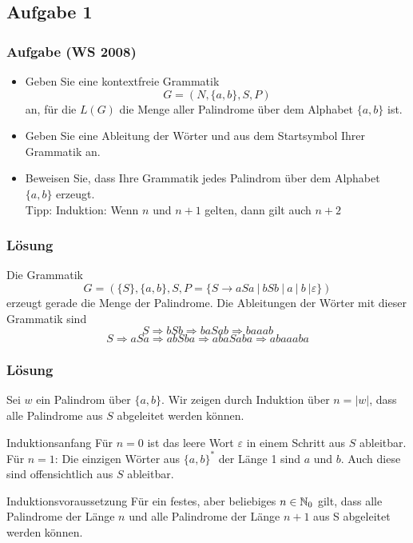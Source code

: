 \subsection{Aufgabe 1}
\begin{frame}
	\frametitle{Aufgabe (WS 2008) }
	\begin{itemize}
		\item Geben Sie eine kontextfreie Grammatik $$G = (N, \{a, b\}, S, P )$$ an, für die $L(G)$ die Menge aller Palindrome über dem Alphabet $\{a, b\}$ ist.
		\item Geben Sie eine Ableitung der Wörter  und  aus dem Startsymbol Ihrer Grammatik an.
		\item Beweisen Sie, dass Ihre Grammatik jedes Palindrom über dem Alphabet $\{a, b\}$ erzeugt.\\
		Tipp: Induktion: Wenn $n$ und $n+1$ gelten, dann gilt auch $n+2$
	\end{itemize}
\end{frame}

\begin{frame}
	\frametitle{Lösung}
	Die Grammatik $$G = (\{S\}, \{a, b\}, S, P = \{S \to aSa \ | \ bSb \ | \ a \ | \ b \ | \varepsilon \})$$ erzeugt gerade die Menge der Palindrome. \pause Die Ableitungen der Wörter mit dieser Grammatik sind 
	$$S \Rightarrow bSb \Rightarrow baSab \Rightarrow baaab$$
	$$S \Rightarrow aSa \Rightarrow abSba \Rightarrow abaSaba \Rightarrow abaaaba$$
\end{frame}

\begin{frame}
	\frametitle{Lösung}
	Sei $w$ ein Palindrom über $\{a, b\}$. Wir zeigen durch Induktion über $n = \vert w \vert$, dass alle Palindrome aus $S$ abgeleitet werden können. \pause
	\begin{block}{Induktionsanfang} \pause
		Für $n = 0$ ist das leere Wort $\varepsilon$ in einem Schritt aus $S$ ableitbar. \\
		Für $n=1$: Die einzigen Wörter aus $\{a, b\}^\ast$ der Länge 1 sind $a$ und $b$. Auch diese sind offensichtlich aus $S$ ableitbar.
	\end{block}
 	\pause
	\begin{block}{Induktionsvoraussetzung} \pause
		Für ein festes, aber beliebiges $n \in \mathbb{N}_0$ gilt, dass alle Palindrome der Länge $n$ und alle Palindrome der Länge $n + 1$ aus S abgeleitet werden können.
	\end{block}
\end{frame}

